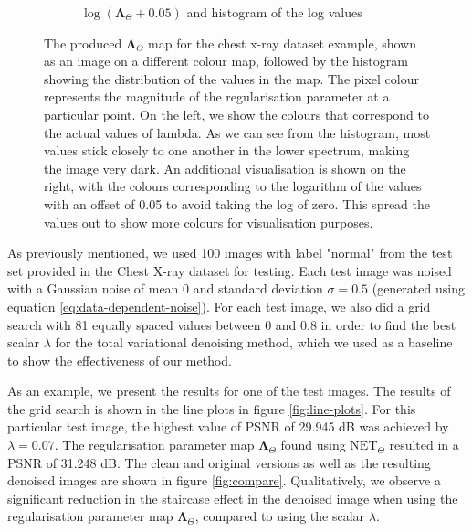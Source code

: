 \documentclass[12pt]{article}
\begin{document}
\begin{figure}[H]
\begin{subfigure}{0.48\textwidth}
  \caption{$\log{(\mathbf{\Lambda}_{\Theta} + 0.05)}$ and histogram of the log values}
  \end{subfigure}
  \caption{The produced $\mathbf{\Lambda}_{\Theta}$ map for the chest x-ray dataset example, shown as an image on a different colour map, followed by the histogram showing the distribution of the values in the map. The pixel colour represents the magnitude of the regularisation parameter at a particular point. On the left, we show the colours that correspond to the actual values of lambda. As we can see from the histogram, most values stick closely to one another in the lower spectrum, making the image very dark. An additional visualisation is shown on the right, with the colours corresponding to the logarithm of the values with an offset of 0.05 to avoid taking the log of zero. This spread the values out to show more colours for visualisation purposes.}
  \label{fig:lambda-map}
\end{figure}

As previously mentioned, we used 100 images with label "normal" from the test set provided in the Chest X-ray dataset for testing.
Each test image was noised with a Gaussian noise of mean 0 and standard deviation $\sigma = 0.5$ (generated using equation \ref{eq:data-dependent-noise}).
For each test image, we also did a grid search with 81 equally spaced values between 0 and 0.8 in order to find the best scalar $\lambda$ for the total variational denoising method, which we used as a baseline to show the effectiveness of our method.

As an example, we present the results for one of the test images.
The results of the grid search is shown in the line plots in figure 
\ref{fig:line-plots}.
For this particular test image, the highest value of PSNR of 29.945 dB was achieved by $\lambda = 0.07$.
The regularisation parameter map $\mathbf{\Lambda}_\Theta$ found using $\text{NET}_{\Theta}$ resulted in a PSNR of 31.248 dB.
The clean and original versions as well as the resulting denoised images are shown in figure 
\ref{fig:compare}.
Qualitatively, we observe a significant reduction in the staircase effect in the denoised image when using the regularisation parameter map $\mathbf{\Lambda}_\Theta$, compared to using the scalar $\lambda$.
\end{document}
